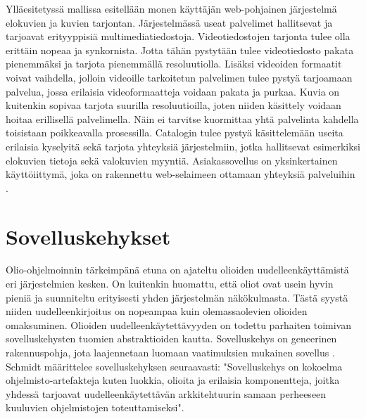 \documentclass[utf8]{gradu3}
\begin{document}
Ylläesitetyssä mallissa esitellään monen käyttäjän web-pohjainen järjestelmä elokuvien ja kuvien tarjontan. Järjestelmässä useat palvelimet hallitsevat ja tarjoavat erityyppisiä multimediatiedostoja. Videotiedostojen tarjonta tulee olla erittäin nopeaa ja synkornista. Jotta tähän pystytään tulee videotiedosto pakata pienemmäksi ja tarjota pienemmällä resoluutiolla. Lisäksi videoiden formaatit voivat vaihdella, jolloin videoille tarkoitetun palvelimen tulee pystyä tarjoamaan palvelua, jossa erilaisia videoformaatteja voidaan pakata ja purkaa. Kuvia on kuitenkin sopivaa tarjota suurilla resoluutioilla, joten niiden käsittely voidaan hoitaa erillisellä palvelimella. Näin ei tarvitse kuormittaa yhtä palvelinta kahdella toisistaan poikkeavalla prosessilla. Catalogin tulee pystyä käsittelemään useita erilaisia kyselyitä sekä tarjota yhteyksiä järjestelmiin, jotka hallitsevat esimerkiksi elokuvien tietoja sekä valokuvien myyntiä. Asiakassovellus on yksinkertainen käyttöiittymä, joka on rakennettu web-selaimeen ottamaan yhteyksiä palveluihin \parencite[s. 163]{Sommerville}. 

\chapter{Sovelluskehykset}
Olio-ohjelmoinnin tärkeimpänä etuna on ajateltu olioiden uudelleenkäyttämistä eri järjestelmien kesken. On kuitenkin huomattu, että oliot ovat usein hyvin pieniä ja suunniteltu erityisesti yhden järjestelmän näkökulmasta. Tästä syystä niiden uudelleenkirjoitus on nopeampaa kuin olemassaolevien olioiden omaksuminen. Olioiden uudelleenkäytettävyyden on todettu parhaiten toimivan sovelluskehysten tuomien abstraktioiden kautta. Sovelluskehys on geneerinen rakennuspohja, jota laajennetaan luomaan vaatimuksien mukainen sovellus \parencite[s. 431]{Sommerville}. Schmidt \parencite{frameworks} määrittelee sovelluskehyksen seuraavasti: "Sovelluskehys on kokoelma ohjelmisto-artefakteja kuten luokkia, olioita ja erilaisia komponentteja, joitka yhdessä tarjoavat uudelleenkäytettävän arkkitehtuurin samaan perheeseen kuuluvien ohjelmistojen toteuttamiseksi".
\end{document}
